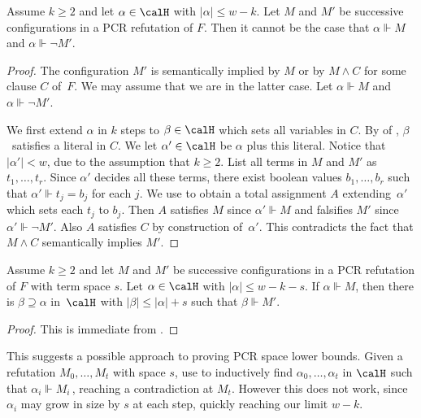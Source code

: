 \begin{lemma}\label{lem:forcing-soundness}
Assume $k \ge 2$ and let $\alpha \in \calH$ with $|\alpha| \le w-k$. 
Let $M$ and $M'$ be successive configurations in a PCR refutation of $F$.
Then it cannot be the case that $\alpha \Vdash M$ and $\alpha \Vdash \neg M'$.
\end{lemma}

\begin{proof}
The configuration $M'$ is semantically implied by $M$ or by 
$M \land C$ for some clause $C$ of~$F$. 
We may assume that we are in the latter case.
Let $\alpha \Vdash M$ and $\alpha \Vdash \neg M'$.
 
We first extend $\alpha$ in 
$k$ steps to $\beta \in \calH$ which sets all variables in $C$.
By 
of , $\beta$~satisfies a literal in $C$.
We let $\alpha' \in \calH$ be $\alpha$ plus this literal. 
Notice that~$|\alpha'| < w$, due to the assumption that $k \ge 2$.
List all terms in $M$ and $M'$ as $t_1, \ldots, t_r$.
Since $\alpha'$ decides all these terms, 
there exist boolean values $b_1, \ldots, b_{r}$ such that
$\alpha' \Vdash t_j = b_j$ for each $j$. 
We use 
to obtain a total assignment $A$ extending~$\alpha'$ 
which sets each $t_j$ to $b_j$. 
Then $A$ satisfies $M$ since $\alpha' \Vdash M$ 
and falsifies $M'$ since~$\alpha' \Vdash \neg M'$.
Also $A$ satisfies $C$
by  construction of~$\alpha'$. This contradicts
the fact that $M \wedge C$ semantically implies $M'$.
\end{proof}



\begin{corollary} \label{cor:extend_one_step}
Assume $k \ge 2$ and let $M$ and $M'$ be successive configurations in
a PCR refutation of $F$ with term space $s$.
Let $\alpha \in \calH$ with $|\alpha|\le w-k-s$.
If $\alpha \Vdash M$, then there is $\beta \supseteq \alpha$
in~$\calH$ with $|\beta| \le |\alpha|+s$ such that 
$\beta \Vdash M'$.
\end{corollary}

\begin{proof}
This is immediate from 
.   %
\end{proof}

This suggests a possible approach to proving PCR space lower bounds.
Given a refutation $M_0, \dots, M_t$ with space $s$,
use  to
inductively find $\alpha_0, \dots, \alpha_t$ in $\calH$
such that $\alpha_i \Vdash M_i$\,, reaching a contradiction
at $M_t$. However this does not work, since $\alpha_i$
may grow in size by $s$ at each step, quickly reaching
our limit $w-k$. 

